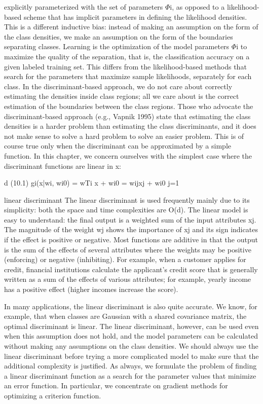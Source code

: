 explicitly parameterized with the set of parameters $\Phi$i, as opposed to a likelihood-based scheme that has implicit parameters in defining the likelihood densities. This is a different inductive bias: instead of making an assumption on the form of the class densities, we make an assumption on the form of the boundaries separating classes. Learning is the optimization of the model parameters $\Phi$i to maximize the quality of the separation, that is, the classification accuracy on a given labeled training set. This differs from the likelihood-based methods that search for the parameters that maximize sample likelihoods, separately for each class. In the discriminant-based approach, we do not care about correctly estimating the densities inside class regions; all we care about is the correct estimation of the boundaries between the class regions. Those who advocate the discriminant-based approach (e.g., Vapnik 1995) state that estimating the class densities is a harder problem than estimating the class discriminants, and it does not make sense to solve a hard problem to solve an easier problem. This is of course true only when the discriminant can be approximated by a simple function. In this chapter, we concern ourselves with the simplest case where the discriminant functions are linear in x:

d (10.1) gi(x|wi, wi0) = wTi x + wi0 = wijxj + wi0 j=1

linear discriminant The linear discriminant is used frequently mainly due to its simplicity: both the space and time complexities are O(d). The linear model is easy to understand: the final output is a weighted sum of the input attributes xj. The magnitude of the weight wj shows the importance of xj and its sign indicates if the effect is positive or negative. Most functions are additive in that the output is the sum of the effects of several attributes where the weights may be positive (enforcing) or negative (inhibiting). For example, when a customer applies for credit, financial institutions calculate the applicant’s credit score that is generally written as a sum of the effects of various attributes; for example, yearly income has a positive effect (higher incomes increase the score).

In many applications, the linear discriminant is also quite accurate. We know, for example, that when classes are Gaussian with a shared covariance matrix, the optimal discriminant is linear. The linear discriminant, however, can be used even when this assumption does not hold, and the model parameters can be calculated without making any assumptions on the class densities. We should always use the linear discriminant before trying a more complicated model to make sure that the additional complexity is justified. As always, we formulate the problem of finding a linear discriminant function as a search for the parameter values that minimize an error function. In particular, we concentrate on gradient methods for optimizing a criterion function.

